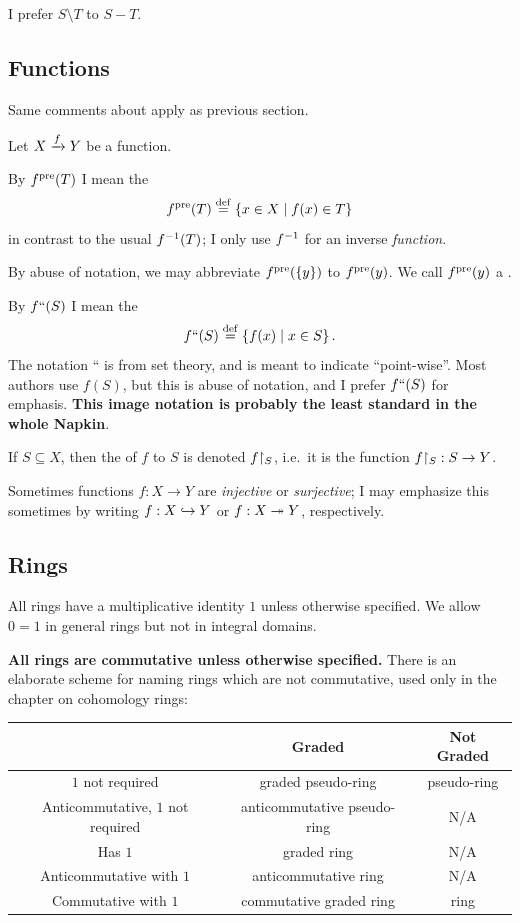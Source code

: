 I prefer $S \setminus T$ to $S - T$.

\subsection*{Functions}
Same comments about  apply as previous section.

Let $X \xrightarrow{f} Y$ be a function.

\begin{itemize}
\ii By $f^{\text{pre}}(T)$ I mean the 
\[ f^{\text{pre}}(T) \overset{\mathrm{def}}{=} \left\{ x \in X \mid f(x) \in T \right\} \]
in contrast to the usual $f^{-1}(T)$; I only use $f^{-1}$ for an inverse \emph{function}.

By abuse of notation, we may abbreviate $f^{\text{pre}}(\{y\})$ to $f^{\text{pre}}(y)$.
We call $f^{\text{pre}}(y)$ a .

\ii By $f``(S)$ I mean the 
\[ f``(S) \overset{\mathrm{def}}{=} \left\{ f(x) \mid x \in S \right\}. \]
The notation {``} is from set theory, and is meant to indicate ``point-wise''.
Most authors use $f(S)$, but this is abuse of notation,
and I prefer $f``(S)$ for emphasis.
\textbf{This image notation is probably the least standard in the whole Napkin}.

\ii If $S \subseteq X$, then the  of $f$ to $S$
is denoted $f \restrict{S}$,
i.e.\ it is the function $f \restrict{S} : S \to Y$.

\ii Sometimes functions $f : X \to Y$ are \emph{injective} or \emph{surjective};
I may emphasize this sometimes by writing $f : X \hookrightarrow Y$ or $f : X \twoheadrightarrow Y$, respectively.
\end{itemize}

\subsection*{Rings}
All rings have a multiplicative identity $1$ unless otherwise specified.
We allow $0=1$ in general rings but not in integral domains.

\textbf{All rings are commutative unless otherwise specified.}
There is an elaborate scheme for naming rings which are not commutative,
used only in the chapter on cohomology rings:

\begin{center}
	\small
	\begin{tabular}[h]{|c|cc|}
		\hline
		& Graded & Not Graded \\ \hline
		$1$ not required & graded pseudo-ring & pseudo-ring \\
		Anticommutative, $1$ not required & anticommutative pseudo-ring & N/A \\
		Has $1$ & graded ring & N/A \\
		Anticommutative with $1$ & anticommutative ring & N/A \\ 
		Commutative with $1$ & commutative graded ring & ring \\ \hline
	\end{tabular}
\end{center}

